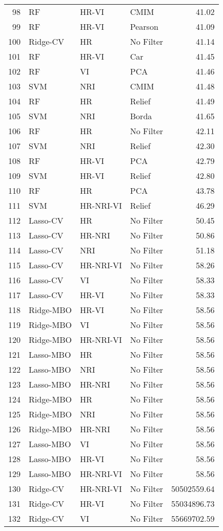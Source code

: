 \begin{table}[ht]
\begin{tabular}{rlllr}
  98 & RF & HR-VI & CMIM & 41.02 \\ 
  99 & RF & HR-VI & Pearson & 41.09 \\ 
  100 & Ridge-CV & HR & No Filter & 41.14 \\ 
  101 & RF & HR-VI & Car & 41.45 \\ 
  102 & RF & VI & PCA & 41.46 \\ 
  103 & SVM & NRI & CMIM & 41.48 \\ 
  104 & RF & HR & Relief & 41.49 \\ 
  105 & SVM & NRI & Borda & 41.65 \\ 
  106 & RF & HR & No Filter & 42.11 \\ 
  107 & SVM & NRI & Relief & 42.30 \\ 
  108 & RF & HR-VI & PCA & 42.79 \\ 
  109 & SVM & HR-VI & Relief & 42.80 \\ 
  110 & RF & HR & PCA & 43.78 \\ 
  111 & SVM & HR-NRI-VI & Relief & 46.29 \\ 
  112 & Lasso-CV & HR & No Filter & 50.45 \\ 
  113 & Lasso-CV & HR-NRI & No Filter & 50.86 \\ 
  114 & Lasso-CV & NRI & No Filter & 51.18 \\ 
  115 & Lasso-CV & HR-NRI-VI & No Filter & 58.26 \\ 
  116 & Lasso-CV & VI & No Filter & 58.33 \\ 
  117 & Lasso-CV & HR-VI & No Filter & 58.33 \\ 
  118 & Ridge-MBO & HR-VI & No Filter & 58.56 \\ 
  119 & Ridge-MBO & VI & No Filter & 58.56 \\ 
  120 & Ridge-MBO & HR-NRI-VI & No Filter & 58.56 \\ 
  121 & Lasso-MBO & HR & No Filter & 58.56 \\ 
  122 & Lasso-MBO & NRI & No Filter & 58.56 \\ 
  123 & Lasso-MBO & HR-NRI & No Filter & 58.56 \\ 
  124 & Ridge-MBO & HR & No Filter & 58.56 \\ 
  125 & Ridge-MBO & NRI & No Filter & 58.56 \\ 
  126 & Ridge-MBO & HR-NRI & No Filter & 58.56 \\ 
  127 & Lasso-MBO & VI & No Filter & 58.56 \\ 
  128 & Lasso-MBO & HR-VI & No Filter & 58.56 \\ 
  129 & Lasso-MBO & HR-NRI-VI & No Filter & 58.56 \\ 
  130 & Ridge-CV & HR-NRI-VI & No Filter & 50502559.64 \\ 
  131 & Ridge-CV & HR-VI & No Filter & 55034896.73 \\ 
  132 & Ridge-CV & VI & No Filter & 55669702.59 \\ 
   \hline
\end{tabular}
\end{table}
